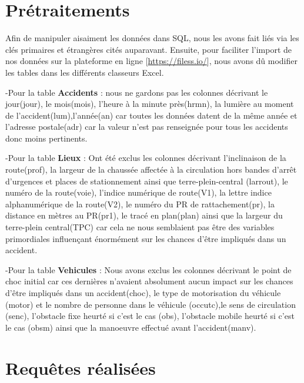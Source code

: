 \documentclass[mstat,12pt]{unswthesis}
\begin{document}
\medskip

\hypertarget{pruxe9traitements}{%
\chapter{Prétraitements}\label{pruxe9traitements}}

\bigskip

Afin de manipuler aisaiment les données dans SQL, nous les avons fait
liés via les clés primaires et étrangères cités auparavant. Ensuite,
pour faciliter l'import de nos données sur la plateforme en ligne
{[}\url{https://filess.io/}{]}, nous avons dû modifier les tables dans
les différents classeurs Excel.

\medskip

-Pour la table \textbf{Accidents} : nous ne gardons pas les colonnes
décrivant le jour(jour), le mois(mois), l'heure à la minute près(hrmn),
la lumière au moment de l'accident(lum),l'année(an) car toutes les
données datent de la même année et l'adresse postale(adr) car la valeur
n'est pas renseignée pour tous les accidents donc moins pertinents.\\
\medskip

-Pour la table \textbf{Lieux} : Ont été exclus les colonnes décrivant
l'inclinaison de la route(prof), la largeur de la chaussée affectée à la
circulation hors bandes d'arrêt d'urgences et places de stationnement
ainsi que terre-plein-central (larrout), le numéro de la route(voie),
l'indice numérique de route(V1), la lettre indice alphanumérique de la
route(V2), le numéro du PR de rattachement(pr), la distance en mètres au
PR(pr1), le tracé en plan(plan) ainsi que la largeur du terre-plein
central(TPC) car cela ne nous semblaient pas être des variables
primordiales influençant énormément sur les chances d'être impliqués
dans un accident.\\
\medskip

-Pour la table \textbf{Vehicules} : Nous avons exclus les colonnes
décrivant le point de choc initial car ces dernières n'avaient
absolument aucun impact sur les chances d'être impliqués dans un
accident(choc), le type de motorisation du véhicule (motor) et le nombre
de personne dans le véhicule (occutc),le sens de circulation (senc),
l'obstacle fixe heurté si c'est le cas (obs), l'obstacle mobile heurté
si c'est le cas (obsm) ainsi que la manoeuvre effectué avant
l'accident(manv).

\hypertarget{requuxeates-ruxe9alisuxe9es}{%
\chapter{Requêtes réalisées}\label{requuxeates-ruxe9alisuxe9es}}
\end{document}
